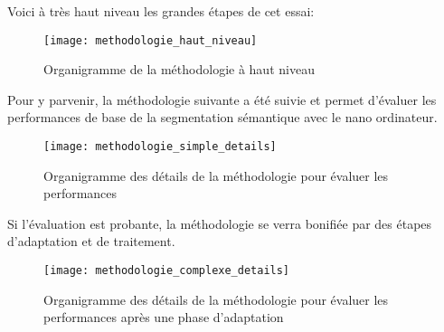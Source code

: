 ﻿\noindent Voici à très haut niveau les grandes étapes de cet essai:
\label{methodologie_haut_niveau}
\begin{figure}[H]
    \centering
    \texttt{[image: methodologie\_haut\_niveau]}
    \caption{Organigramme de la méthodologie à haut niveau}
    \label{fig:methodologie_haut_niveau}
\end{figure}
\noindent Pour y parvenir, la méthodologie suivante a été suivie et permet d'évaluer les performances de base de la segmentation sémantique avec le nano ordinateur.
\label{methodologie_simple_details}
\begin{figure}[H]
    \centering
    \texttt{[image: methodologie\_simple\_details]}
    \caption{Organigramme des détails de la méthodologie pour évaluer les performances}
    \label{fig:methodologie_simple_details}
\end{figure}
\noindent Si l'évaluation est probante, la méthodologie se verra bonifiée par des étapes d'adaptation et de traitement. 
\label{methodologie_complexe_details}
\begin{figure}[H]
    \centering
    \texttt{[image: methodologie\_complexe\_details]}
    \caption{Organigramme des détails de la méthodologie pour évaluer les performances après une phase d'adaptation}
    \label{fig:methodologie_complexe_details}
\end{figure}
